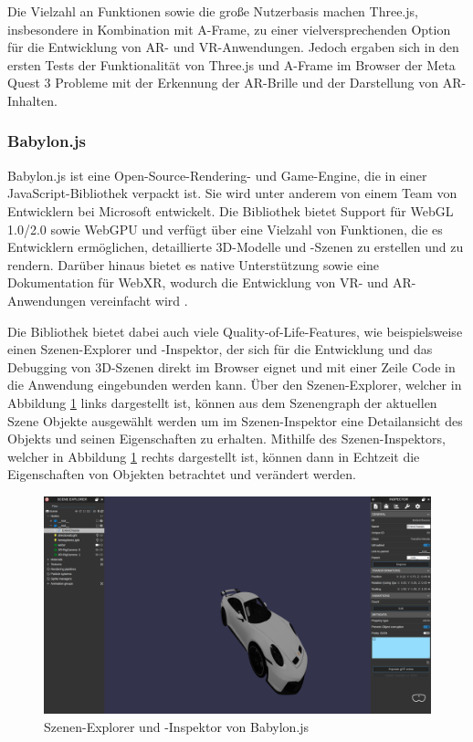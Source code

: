 Die Vielzahl an Funktionen sowie die große Nutzerbasis machen Three.js, insbesondere in Kombination mit A-Frame, zu einer vielversprechenden Option für die Entwicklung von AR- und VR-Anwendungen.
Jedoch ergaben sich in den ersten Tests der Funktionalität von Three.js und A-Frame im Browser der Meta Quest 3 Probleme mit der Erkennung der AR-Brille und der Darstellung von AR-Inhalten.

\subsubsection{Babylon.js}

Babylon.js ist eine Open-Source-Rendering- und Game-Engine, die in einer JavaScript-Bibliothek verpackt ist.
Sie wird unter anderem von einem Team von Entwicklern bei Microsoft entwickelt.
Die Bibliothek bietet Support für WebGL 1.0/2.0 sowie WebGPU und verfügt über eine Vielzahl von Funktionen, die es Entwicklern ermöglichen, detaillierte 3D-Modelle und -Szenen zu erstellen und zu rendern.
Darüber hinaus bietet es native Unterstützung sowie eine Dokumentation für WebXR, wodurch die Entwicklung von VR- und AR-Anwendungen vereinfacht wird \autocite[][]{babylon-features}.

Die Bibliothek bietet dabei auch viele Quality-of-Life-Features, wie beispielsweise einen Szenen-Explorer und -Inspektor, der sich für die Entwicklung und das Debugging von 3D-Szenen direkt im Browser eignet und mit einer Zeile Code in die Anwendung eingebunden werden kann.
Über den Szenen-Explorer, welcher in Abbildung \ref{fig:babylon-inspector} links dargestellt ist, können aus dem Szenengraph der aktuellen Szene Objekte ausgewählt werden um im Szenen-Inspektor eine Detailansicht des Objekts und seinen Eigenschaften zu erhalten.
Mithilfe des Szenen-Inspektors, welcher in Abbildung \ref{fig:babylon-inspector} rechts dargestellt ist, können dann in Echtzeit die Eigenschaften von Objekten betrachtet und verändert werden.

\begin{figure}[H]
  \centering
  \includegraphics[width=1\textwidth]{images/BabylonInspector.png}
  \caption{Szenen-Explorer und -Inspektor von Babylon.js}
  \label{fig:babylon-inspector}
\end{figure}

